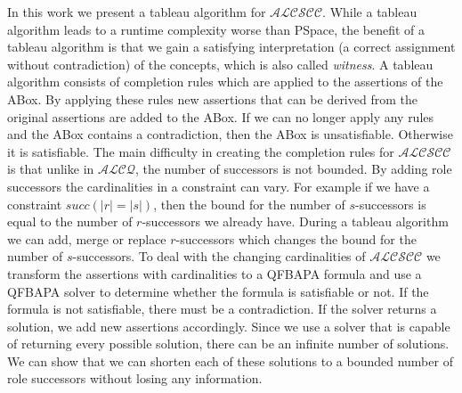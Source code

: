 \documentclass{book}
\theoremstyle{break}
\theoremstyle{definition}
\begin{document}
In this work we present a tableau algorithm for $\mathcal{ALCSCC}$. While a tableau algorithm leads to a runtime complexity worse than PSpace, the benefit of a tableau algorithm is that we gain a satisfying interpretation (a correct assignment without contradiction) of the concepts, which is also called \textit{witness}. A tableau algorithm consists of completion rules which are applied to the assertions of the ABox. By applying these rules new assertions that can be derived from the original assertions are added to the ABox. If we can no longer apply any rules and the ABox contains a contradiction, then the ABox is unsatisfiable. Otherwise it is satisfiable. The main difficulty in creating the completion rules for $\mathcal{ALCSCC}$ is that unlike in $\mathcal{ALCQ}$, the number of successors is not bounded. By adding role successors the cardinalities in a constraint can vary. For example if we have a constraint $succ(|r|=|s|)$, then the bound for the number of $s$-successors is equal to the number of $r$-successors we already have. During a tableau algorithm we can add, merge or replace $r$-successors which changes the bound for the number of $s$-successors. To deal with the changing cardinalities of $\mathcal{ALCSCC}$ we transform the assertions with cardinalities to a QFBAPA formula and use a QFBAPA solver to determine whether the formula is satisfiable or not. If the formula is not satisfiable, there must be a contradiction. If the solver returns a solution, we add new assertions accordingly. Since we use a solver that is capable of returning every possible solution, there can be an infinite number of solutions. We can show that we can shorten each of these solutions to a bounded number of role successors without losing any information.
\end{document}
